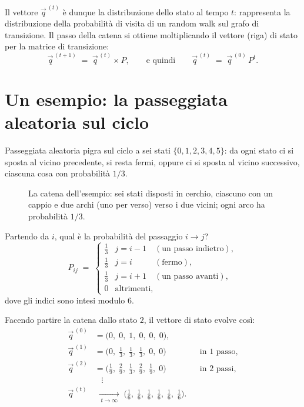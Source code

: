Il vettore $\vec{q}^{\,(t)}$ è dunque la distribuzione dello stato al tempo $t$:
rappresenta la distribuzione della probabilità di visita di un random walk sul grafo di
transizione. Il passo della catena si ottiene moltiplicando il vettore (riga) di stato
per la matrice di transizione:
\[
  \vec{q}^{\,(t+1)} \;=\; \vec{q}^{\,(t)} \times P ,
  \qquad\text{e quindi}\qquad
  \vec{q}^{\,(t)} \;=\; \vec{q}^{\,(0)}\, P^{t} .
\]


\section{Un esempio: la passeggiata aleatoria sul ciclo}
\label{sec:mc-esempio-ciclo}


\begin{esempio}\label{es:ciclo6}
Passeggiata aleatoria pigra sul ciclo a sei stati $\{0,1,2,3,4,5\}$: da ogni
stato ci si sposta al vicino precedente, si resta fermi, oppure ci si sposta al
vicino successivo, ciascuna cosa con probabilità $1/3$.

\begin{figure}[H]
\centering

\caption{La catena dell'esempio: sei stati disposti in cerchio, ciascuno con un
cappio e due archi (uno per verso) verso i due vicini; ogni arco ha probabilità
$1/3$.}
\label{fig:p74-ciclo6}
\end{figure}

Partendo da $i$, qual è la probabilità del passaggio $i \to j$?
\[
  P_{ij} \;=\;
  \begin{cases}
    \tfrac13 & j = i-1 \quad(\text{un passo indietro}),\\[2pt]
    \tfrac13 & j = i \phantom{{}-1} \quad(\text{fermo}),\\[2pt]
    \tfrac13 & j = i+1 \quad(\text{un passo avanti}),\\[2pt]
    0        & \text{altrimenti,}
  \end{cases}
\]
dove gli indici sono intesi modulo $6$.

Facendo partire la catena dallo stato $2$, il vettore di stato evolve così:
\begin{align*}
  \vec{q}^{\,(0)} &= \bigl(0,\;0,\;1,\;0,\;0,\;0\bigr), \\
  \vec{q}^{\,(1)} &= \bigl(0,\;\tfrac13,\;\tfrac13,\;\tfrac13,\;0,\;0\bigr)
               && \text{in $1$ passo,}\\
  \vec{q}^{\,(2)} &= \bigl(\tfrac19,\;\tfrac29,\;\tfrac13,\;\tfrac29,\;\tfrac19,\;0\bigr)
               && \text{in $2$ passi,}\\
  &\;\;\;\vdots \\
  \vec{q}^{\,(t)} &\;\xrightarrow[\;t\to\infty\;]{}\;
               \bigl(\tfrac16,\;\tfrac16,\;\tfrac16,\;\tfrac16,\;\tfrac16,\;\tfrac16\bigr).
\end{align*}
\end{esempio}


